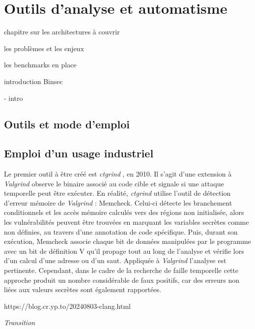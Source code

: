 \chapter{Outils d'analyse et automatisme}
\label{chap:automateVerifAutomatisme}

chapitre sur les architectures à couvrir 

les problèmes et les enjeux

les benchmarks en place

introduction Binsec


- intro


\section{Outils et mode d'emploi}


\section{Emploi d'un usage industriel}

Le premier outil à être créé est \textit{ctgrind} \cite{ctgrind}, en 2010. Il s'agit d'une extension à \textit{Valgrind} observe le binaire associé au code cible et signale si une attaque temporelle peut être exécuter. En réalité, \textit{ctgrind} utilise l'outil de détection d'erreur mémoire de \textit{Valgrind} : Memcheck. Celui-ci détecte les branchement conditionnels et les accès mémoire calculés vers des régions non initialisée, alors les vulnérabilités peuvent être trouvées en marquant les variables secrètes comme non définies, au travers d'une annotation de code spécifique. Puis, durant son exécution, Memcheck associe chaque bit de données manipulées par le programme avec un bit de définition V qu'il propage tout au long de l'analyse et vérifie lors d'un calcul d'une adresse ou d'un saut. Appliquée à \textit{Valgrind} l'analyse est pertinente. Cependant, dans le cadre de la recherche de faille temporelle cette approche produit un nombre considérable de faux positifs, car des erreurs non liées aux valeurs secrètes sont également rapportées.\medbreak




https://blog.cr.yp.to/20240803-clang.html






\vfill
\textit{Transition}